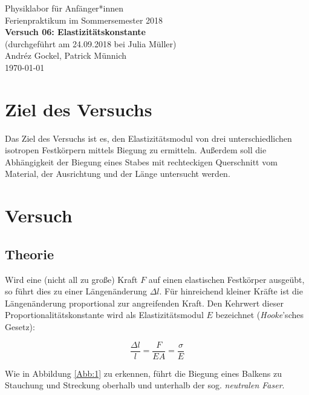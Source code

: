 \documentclass[11pt,a4paper]{article}
\begin{document}
{
\centering 
\large 
Physiklabor für Anf\"anger*innen \\
Ferienpraktikum im Sommersemester 2018 \\[4mm]
\textbf{\LARGE 
Versuch 06: Elastizitätskonstante
} \\[3mm]
(durchgef\"uhrt am 24.09.2018 bei Julia Müller) \\
Andréz Gockel, Patrick M\"unnich\\
\today \\[10mm]
}

\vspace{50pt}
\tableofcontents
\vspace{22pt}
\listoftables
\vspace{22pt}
\listoffigures
\pagebreak
\phantom{lol}
\thispagestyle{empty}
\pagebreak


\section{Ziel des Versuchs}

Das Ziel des Versuchs ist es, den Elastizit\"atsmodul von drei unterschiedlichen isotropen Festk\"orpern mittels Biegung zu ermitteln. Au\ss erdem soll die Abh\"angigkeit der Biegung eines Stabes mit rechteckigen Querschnitt vom Material, der Ausrichtung und der L\"ange untersucht werden.

\section{Versuch}

\subsection{Theorie}

Wird eine (nicht all zu gro\ss e) Kraft $F$ auf einen elastischen Festk\"orper ausge\"ubt, so f\"uhrt dies zu einer L\"angen\"anderung $\Delta l$. F\"ur hinreichend kleiner Kr\"afte ist die L\"angen\"anderung proportional zur angreifenden Kraft. Den Kehrwert dieser Proportionalit\"atskonstante wird als Elastizit\"atsmodul $E$ bezeichnet (\textit{Hooke}'sches Gesetz):

\begin{equation}
\frac{\Delta l}{l}=\frac{F}{EA}=\frac{\sigma}{E}\label{eq:elast}
\end{equation}

Wie in Abbildung \ref{Abb:1} zu erkennen, f\"uhrt die Biegung eines Balkens zu Stauchung und Streckung oberhalb und unterhalb der sog. \textit{neutralen Faser}.
\end{document}
